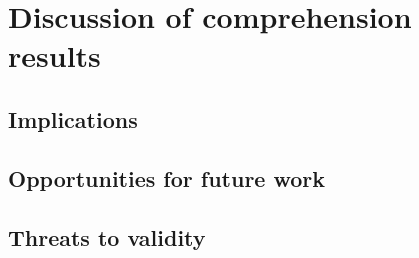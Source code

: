 \section{Discussion of comprehension results}
\subsection{Implications}
\subsection{Opportunities for future work}
\subsection{Threats to validity}



